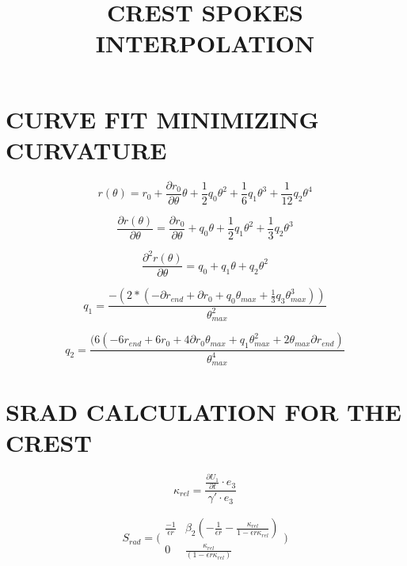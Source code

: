 \documentclass[a4paper,twoside]{article}
\begin{document}
\title{\uppercase{Crest Spokes Interpolation}}


\section{\uppercase{Curve fit minimizing curvature}}
\label{sec:curvefit}

\begin{equation}
 r(\theta) = r_0 + \frac{\partial r_0}{\partial \theta}  \theta + \frac{1}{2}  q_0  \theta^2 + \frac{1}{6}  q_1  \theta^3 + \frac{1}{12}  q_2  \theta^4  
\end{equation}

\begin{equation}
 \frac{\partial r(\theta)}{\partial \theta} = \frac{\partial r_0}{\partial \theta} + q_0  \theta + \frac{1}{2}  q_1  \theta^2 + \frac{1}{3}  q_2  \theta^3  
\end{equation}

\begin{equation}
 \frac{\partial^2 r(\theta)}{\partial \theta} = q_0  +  q_1  \theta + q_2  \theta^2  
\end{equation}

\begin{equation}
q_1 = \frac{-(2*(-\partial r_{end} + \partial r_0 + q_0 \theta_{max} + \frac{1}{3} q_3  \theta_{max}^3))}{\theta_{max}^2}
\end{equation}

\begin{equation}
q_2 = \frac{(6 (-6 r_{end} + 6 r_0 + 4 \partial r_0 \theta_{max} + q_1 \theta_{max}^2 + 2 \theta_{max} \partial r_{end})}{\theta_{max}^4}
\end{equation}


\section{\uppercase{Srad Calculation for the crest}}
\label{sec:Sradcalculation}
 


\begin{equation}
 \kappa_{rel} = \frac{\frac{\partial U_1}{\partial t} \cdot e_3 }{ \gamma' \cdot e_3}
 \label{equ:kapparel} 
\end{equation}


\begin{equation}
 S_{rad} = \bigg( \begin{matrix} \frac{-1}{\epsilon r} & \beta_2 (-\frac{1}{\epsilon r} - \frac{ \kappa_{rel} } { 1 - \epsilon r \kappa_{rel} }) \\ 0 & \frac{\kappa_{rel}}{ (1 - \epsilon r \kappa_{rel})} \end{matrix} \bigg)
\end{equation}
\end{document}
